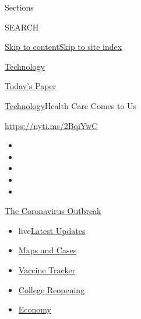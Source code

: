 Sections

SEARCH

\protect\hyperlink{site-content}{Skip to
content}\protect\hyperlink{site-index}{Skip to site index}

\href{https://www.nytimes3xbfgragh.onion/section/technology}{Technology}

\href{https://myaccount.nytimes3xbfgragh.onion/auth/login?response_type=cookie\&client_id=vi}{}

\href{https://www.nytimes3xbfgragh.onion/section/todayspaper}{Today's
Paper}

\href{/section/technology}{Technology}\textbar{}Health Care Comes to Us

\url{https://nyti.ms/2BqiYwC}

\begin{itemize}
\item
\item
\item
\item
\item
\end{itemize}

\href{https://www.nytimes3xbfgragh.onion/news-event/coronavirus?action=click\&pgtype=Article\&state=default\&region=TOP_BANNER\&context=storylines_menu}{The
Coronavirus Outbreak}

\begin{itemize}
\tightlist
\item
  live\href{https://www.nytimes3xbfgragh.onion/2020/08/04/world/coronavirus-covid-19.html?action=click\&pgtype=Article\&state=default\&region=TOP_BANNER\&context=storylines_menu}{Latest
  Updates}
\item
  \href{https://www.nytimes3xbfgragh.onion/interactive/2020/us/coronavirus-us-cases.html?action=click\&pgtype=Article\&state=default\&region=TOP_BANNER\&context=storylines_menu}{Maps
  and Cases}
\item
  \href{https://www.nytimes3xbfgragh.onion/interactive/2020/science/coronavirus-vaccine-tracker.html?action=click\&pgtype=Article\&state=default\&region=TOP_BANNER\&context=storylines_menu}{Vaccine
  Tracker}
\item
  \href{https://www.nytimes3xbfgragh.onion/2020/08/02/us/covid-college-reopening.html?action=click\&pgtype=Article\&state=default\&region=TOP_BANNER\&context=storylines_menu}{College
  Reopening}
\item
  \href{https://www.nytimes3xbfgragh.onion/live/2020/08/03/business/stock-market-today-coronavirus?action=click\&pgtype=Article\&state=default\&region=TOP_BANNER\&context=storylines_menu}{Economy}
\end{itemize}

